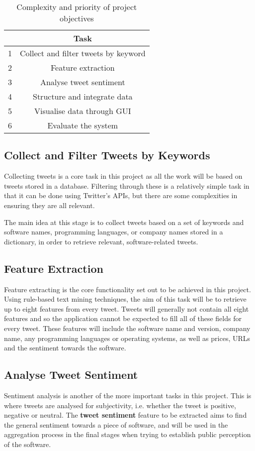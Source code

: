 \begin{table}
\begin{center}
\begin{tabular}{|r|c|}\hline\hline
&Task\\\hline
1&Collect and filter tweets by keyword\\
2&Feature extraction\\
3&Analyse tweet sentiment\\
4&Structure and integrate data\\
5&Visualise data through GUI\\
6&Evaluate the system\\\hline\hline
\end{tabular}
\end{center}
\caption{Complexity and priority of project objectives}\label{objectives}
\end{table}

\subsection{Collect and Filter Tweets by Keywords}
Collecting tweets is a core task in this project as all the work will be based on tweets stored in a database. Filtering through these is a relatively simple task in that it can be done using Twitter's APIs, but there are some complexities in ensuring they are all relevant.

The main idea at this stage is to collect tweets based on a set of keywords and software names, programming languages, or company names stored in a dictionary, in order to retrieve relevant, software-related tweets.

\subsection{Feature Extraction}
Feature extracting is the core functionality set out to be achieved in this project. Using rule-based text mining techniques, the aim of this task will be to retrieve up to eight features from every tweet. Tweets will generally not contain all eight features and so the application cannot be expected to fill all of these fields for every tweet. These features will include the software name and version, company name, any programming languages or operating systems, as well as prices, URLs and the sentiment towards the software.

\subsection{Analyse Tweet Sentiment}
Sentiment analysis is another of the more important tasks in this project. This is where tweets are analysed for subjectivity, i.e. whether the tweet is positive, negative or neutral. The \textbf{tweet sentiment} feature to be extracted aims to find the general sentiment towards a piece of software, and will be used in the aggregation process in the final stages when trying to establish public perception of the software.

